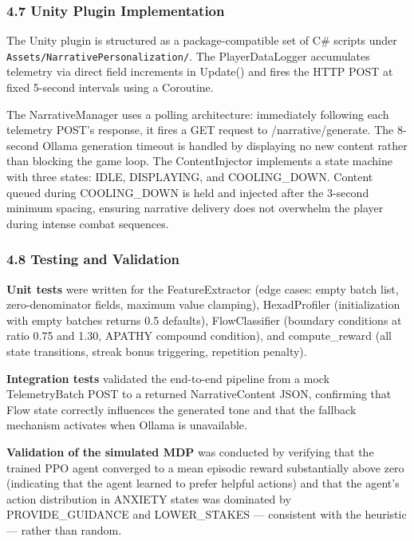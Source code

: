 \subsubsection{4.7 Unity Plugin
Implementation}\label{unity-plugin-implementation}

The Unity plugin is structured as a package-compatible set of C\#
scripts under \texttt{Assets/NarrativePersonalization/}. The
PlayerDataLogger accumulates telemetry via direct field increments in
Update() and fires the HTTP POST at fixed 5-second intervals using a
Coroutine.

The NarrativeManager uses a polling architecture: immediately following
each telemetry POST's response, it fires a GET request to
/narrative/generate. The 8-second Ollama generation timeout is handled
by displaying no new content rather than blocking the game loop. The
ContentInjector implements a state machine with three states: IDLE,
DISPLAYING, and COOLING\_DOWN. Content queued during COOLING\_DOWN is
held and injected after the 3-second minimum spacing, ensuring narrative
delivery does not overwhelm the player during intense combat sequences.

\subsubsection{4.8 Testing and Validation}\label{testing-and-validation}

\textbf{Unit tests} were written for the FeatureExtractor (edge cases:
empty batch list, zero-denominator fields, maximum value clamping),
HexadProfiler (initialization with empty batches returns 0.5 defaults),
FlowClassifier (boundary conditions at ratio 0.75 and 1.30, APATHY
compound condition), and compute\_reward (all state transitions, streak
bonus triggering, repetition penalty).

\textbf{Integration tests} validated the end-to-end pipeline from a mock
TelemetryBatch POST to a returned NarrativeContent JSON, confirming that
Flow state correctly influences the generated tone and that the fallback
mechanism activates when Ollama is unavailable.

\textbf{Validation of the simulated MDP} was conducted by verifying that
the trained PPO agent converged to a mean episodic reward substantially
above zero (indicating that the agent learned to prefer helpful actions)
and that the agent's action distribution in ANXIETY states was dominated
by PROVIDE\_GUIDANCE and LOWER\_STAKES --- consistent with the heuristic
--- rather than random.

